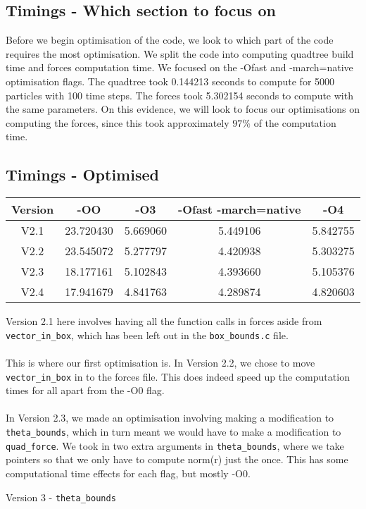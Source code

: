\documentclass{article}
\begin{document}
\subsection{Timings - Which section to focus on}
Before we begin optimisation of the code, we look to which part of the code requires the most optimisation. We split the code into computing quadtree build time and forces computation time. We focused on the -Ofast and -march=native optimisation flags. The quadtree took 0.144213 seconds to compute for 5000 particles with 100 time steps. The forces took 5.302154 seconds to compute with the same parameters. On this evidence, we will look to focus our optimisations on computing the forces, since this took approximately $97\%$ of the computation time.
\subsection{Timings - Optimised}
\begin{center}
\begin{tabular}{|c|c|c|c|c|}
\hline
Version & -OO & -O3 & -Ofast -march=native & -O4\\
\hline
V2.1 & 23.720430 & 5.669060 & 5.449106 & 5.842755\\
\hline
V2.2 & 23.545072 & 5.277797 & 4.420938 & 5.303275\\
\hline
V2.3 & 18.177161 & 5.102843 & 4.393660 & 5.105376\\
\hline
V2.4 & 17.941679 & 4.841763 & 4.289874 & 4.820603\\
\hline
\end{tabular}
\end{center}
Version 2.1 here involves having all the function calls in forces aside from \verb|vector_in_box|, which has been left out in the \verb|box_bounds.c| file. 
\\\\
This is where our first optimisation is. In Version 2.2, we chose to move \verb|vector_in_box| in to the forces file. This does indeed speed up the computation times for all apart from the -O0 flag.
\\\\
In Version 2.3, we made an optimisation involving making a modification to \verb|theta_bounds|, which in turn meant we would have to make a modification to \verb|quad_force|. We took in two extra arguments in \verb|theta_bounds|, where we take pointers so that we only have to compute norm(r) just the once. This has some computational time effects for each flag, but mostly -O0. 
\begin{center}
    Version 3 - \verb|theta_bounds|
\end{center}
\end{document}
